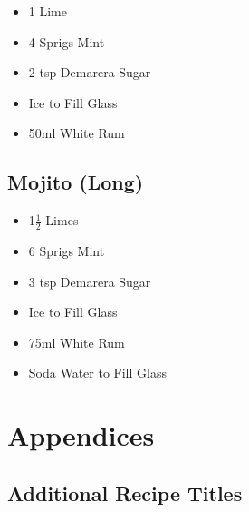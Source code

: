 \documentclass[11pt, english]{article}
\begin{document}
	\begin{itemize}
        \setlength\itemsep{0cm}
                \item 1 Lime
		\item 4 Sprigs Mint
		\item 2 tsp Demarera Sugar
		\item Ice to Fill Glass
		\item 50ml White Rum
        \end{itemize}

	\subsection{Mojito (Long)}

	\begin{itemize}
        \setlength\itemsep{0cm}
		\item 1$\frac{1}{2}$ Limes
		\item 6 Sprigs Mint
		\item 3 tsp Demarera Sugar
		\item Ice to Fill Glass
		\item 75ml White Rum
		\item Soda Water to Fill Glass
        \end{itemize}

\newpage

\section{Appendices}

	\subsection{Additional Recipe Titles}
	
\end{document}
